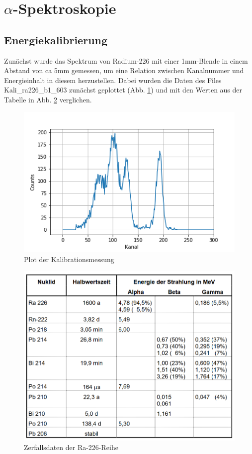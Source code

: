 

\section{$\alpha$-Spektroskopie}

\subsection{Energiekalibrierung}
\label{subs:kali}

Zunächst wurde das Spektrum von Radium-226 mit einer 1mm-Blende in einem Abstand von ca 5mm gemessen, um eine Relation zwischen Kanalnummer 
und Energieinhalt in diesem herzustellen. Dabei wurden die Daten des Files Kali\_ra226\_b1\_603 zunächst geplottet (Abb. \ref{bild:kali}) 
und mit den Werten aus der Tabelle in Abb. \ref{bild:TabelleRa} verglichen.

\begin{figure}[h]
    \centering
    \includegraphics[scale=0.65]{Bilder/kali.png}
    \caption{Plot der Kalibrationsmessung} 
    \label{bild:kali}
\end{figure}

\begin{figure}[h]
    \centering
    \includegraphics[scale=0.5]{Bilder/TabelleRadium.png}
    \caption{Zerfallsdaten der Ra-226-Reihe \protect \footnotemark}
    \label{bild:TabelleRa}
\end{figure}

